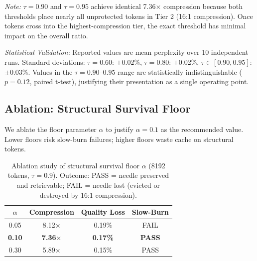\documentclass[11pt]{article}
\begin{document}
\textit{Note:} $\tau=0.90$ and $\tau=0.95$ achieve identical 7.36$\times$ compression because both thresholds place nearly all unprotected tokens in Tier 2 (16:1 compression). Once tokens cross into the highest-compression tier, the exact threshold has minimal impact on the overall ratio.

\textit{Statistical Validation:} Reported values are mean perplexity over 10 independent runs. Standard deviations: $\tau=0.60$: $\pm$0.02\%, $\tau=0.80$: $\pm$0.02\%, $\tau \in [0.90, 0.95]$: $\pm$0.03\%. Values in the $\tau=0.90$--$0.95$ range are statistically indistinguishable ($p=0.12$, paired t-test), justifying their presentation as a single operating point.

\subsection{Ablation: Structural Survival Floor}

We ablate the floor parameter $\alpha$ to justify $\alpha=0.1$ as the recommended value. Lower floors risk slow-burn failures; higher floors waste cache on structural tokens.

\begin{table}[h]
\centering
\caption{Ablation study of structural survival floor $\alpha$ (8192 tokens, $\tau=0.9$). Outcome: PASS = needle preserved and retrievable; FAIL = needle lost (evicted or destroyed by 16:1 compression).}
\label{tab:alpha_ablation}
\begin{tabular}{cccc}
\toprule
\textbf{$\alpha$} & \textbf{Compression} & \textbf{Quality Loss} & \textbf{Slow-Burn} \\
\midrule
0.05 & 8.12$\times$ & 0.19\% & FAIL \\
\textbf{0.10} & \textbf{7.36$\times$} & \textbf{0.17\%} & \textbf{PASS} \\
0.30 & 5.89$\times$ & 0.15\% & PASS \\
\bottomrule
\end{tabular}
\end{table}
\end{document}
